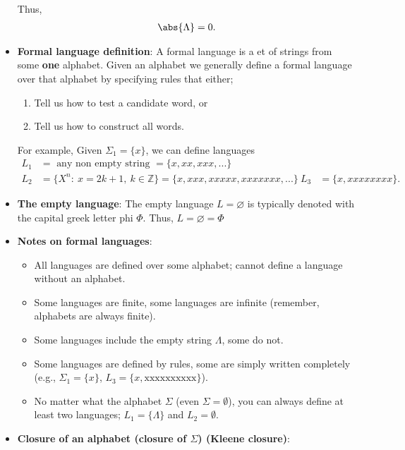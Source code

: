 \documentclass{report}
\begin{document}
\begin{itemize}
            Thus,
            \begin{align*}
                \abs{\Lambda} = 0
            .\end{align*}
        \item \textbf{Formal language definition}: A formal language is a et of strings from some \textbf{one} alphabet. Given an alphabet we generally define a formal language over that alphabet by
            specifying rules that either;
            \begin{enumerate}
                \item Tell us how to test a candidate word, or
                \item Tell us how to construct all words.
            \end{enumerate}
            For example, Given $\Sigma_{1}= \{x\} $, we can define languages
            \begin{align*}
                L_{1} &= \text{ any non empty string } = \{x, xx, xxx,...\} \\
                L_{2} &= \{X^{n}:\ x = 2k+1,\ k\in \mathbb{Z} \} = \{x,xxx,xxxxx,xxxxxxx,...\} \
                L_{3} &= \{x,xxxxxxxx\}
            .\end{align*}
        \item \textbf{The empty language}: The empty language $L = \varnothing$ is typically  denoted with the capital  greek letter phi $\Phi$. Thus, $L = \varnothing = \Phi $
        \item \textbf{Notes on formal languages}:
            \begin{itemize}
                \item All languages are defined over some alphabet; cannot define a language without an alphabet.
                \item Some languages are finite, some languages are infinite (remember, alphabets are always finite).
                \item Some languages include the empty string \(\Lambda\), some do not.
                \item Some languages are defined by rules, some are simply written completely (e.g., \(\Sigma_1 = \{x\}\), \(L_3 = \{x, \text{xxxxxxxxxx}\}\)).
                \item No matter what the alphabet \(\Sigma\) (even \(\Sigma = \emptyset\)), you can always define at least two languages; \(L_1 = \{\Lambda\}\) and \(L_2 = \emptyset\).
            \end{itemize}
        \item \textbf{Closure of an alphabet (closure of $\Sigma$) (Kleene closure)}:

\end{itemize}
\end{document}
